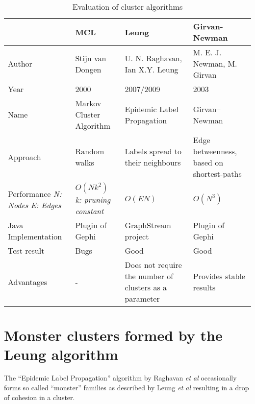 \begin{table}[H]
\centering
\caption{Evaluation of cluster algorithms}
\label{tab:clusterAlgorithms}
\begin{tabular}{|p{2cm}|p{4cm}|p{4cm}|p{4cm}|}
\hline
                    & \textbf{MCL}               & \textbf{Leung}                    & \textbf{Girvan-Newman}  \\ \hline
Author              & Stijn van Dongen\cite{markovCluster} & U. N. Raghavan\cite{raghavan}, Ian X.Y. Leung\cite{leung}    & M. E. J. Newman, M. Girvan\cite{girvan} \\ \hline
Year                & 2000                       & 2007/2009                         & \multicolumn{1}{l|}{2003}                       \\ \hline
Name                & Markov Cluster Algorithm   & Epidemic Label Propagation        & \multicolumn{1}{l|}{Girvan–Newman}              \\ \hline
Approach            & Random walks               & Labels spread to their neighbours & Edge betweenness, based on shortest-paths       \\ \hline
Performance \newline \textit{N: Nodes} \newline \textit{E: Edges}         & $O (N k^2)$ \newline \textit{k: pruning constant} \cite[p.126]{markovCluster} & $O( E N )$ \cite[p.3]{leung}                         & $O ( N^3 )$\cite[p.14]{girvan}       \\ \hline
Java Implementation & Plugin of Gephi\cite{gephiMarkov} & GraphStream project\cite{leungGraphstream} & Plugin of Gephi\cite{girvanGraphstream} \\ \hline
Test result         & Bugs                       & Good                              & \multicolumn{1}{l|}{Good}                       \\ \hline
Advantages & - & Does not require the number of clusters as a parameter & Provides stable results \\
 \hline
\end{tabular}
\end{table}

\section{Monster clusters formed by the Leung algorithm}
\label{sec:monsterclusters}

The \enquote{Epidemic Label Propagation} algorithm by Raghavan \textit{et al} occasionally forms so called \enquote{monster} families as described by Leung \textit{et al} resulting in a drop of cohesion in a cluster. 

